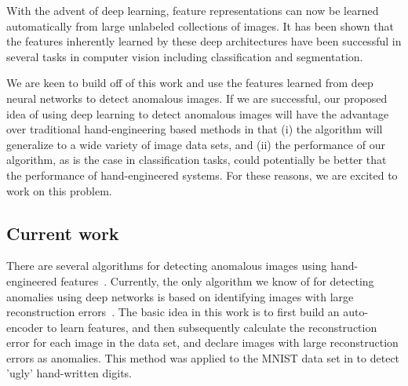 \documentclass[10pt,twocolumn,letterpaper]{article}
\begin{document}
With the advent of deep learning, feature representations can now be learned automatically from large unlabeled collections of images. It has been shown that the features inherently learned by these deep architectures have been successful in several tasks in computer vision including classification and segmentation. 


We are keen to build off of this work and use the features learned from deep neural networks to detect anomalous images. If we are successful, our proposed idea of using deep learning to detect anomalous images will have the advantage over traditional hand-engineering based methods in that (i) the algorithm will generalize to a wide variety of image data sets, and (ii) the performance of our algorithm, as is the case in classification tasks, could potentially be better that the performance of hand-engineered systems. For these reasons, we are excited to work on this problem.


\subsection{Current work}
There are several algorithms for detecting anomalous images using hand-engineered features~\cite{adsurvey}. Currently, the only algorithm we know of for detecting anomalies using deep networks is based on identifying images with large reconstruction errors~\cite{h2o}. The basic idea in this work is to first build an auto-encoder to learn features, and then subsequently calculate the reconstruction error for each image in the data set, and declare images with large reconstruction errors as anomalies. This method was applied to the MNIST data set in \cite{h2o} to detect 'ugly' hand-written digits.
\end{document}
